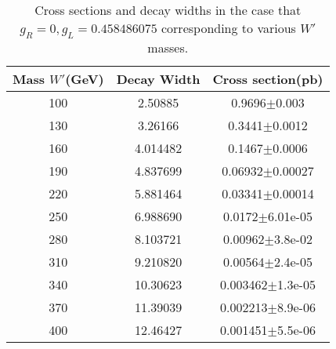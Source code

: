  \begin{table}[htb]
	\centering
\begin{tabular}{|c|c|c|}
\hline 
Mass $W'$(GeV)  &  Decay Width  &  Cross section(pb)\\
\hline 
100 & 2.50885 & 0.9696$\pm$0.003  \\
130 & 3.26166& 0.3441$\pm$0.0012 \\
160 & 4.014482 &0.1467$\pm$0.0006 \\
190 & 4.837699 &0.06932$\pm$0.00027 \\
 220& 5.881464& 0.03341$\pm$0.00014 \\
 250 &6.988690 &0.0172$\pm$6.01e-05 \\
 280 &8.103721 &0.00962$\pm$3.8e-02 \\
 310 &9.210820 &0.00564$\pm$2.4e-05 \\
 340 &10.30623 &0.003462$\pm$1.3e-05 \\
 370 &11.39039& 0.002213$\pm$8.9e-06\\ 
 400 &12.46427 &0.001451$\pm$5.5e-06\\
\hline
\end{tabular}
\caption{Cross sections and decay widths in the case that $ g_R=0 , g_L=0.458486075  $ corresponding to various $W'$ masses. \label{tab1} }
\end{table}

 

